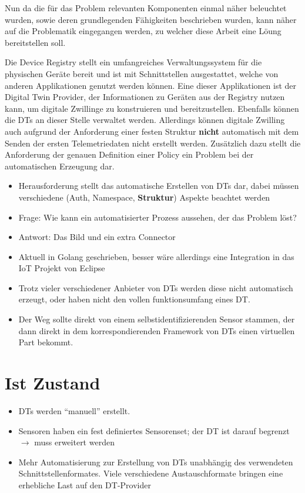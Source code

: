 Nun da die für das Problem relevanten Komponenten einmal näher beleuchtet wurden, sowie deren grundlegenden Fähigkeiten beschrieben wurden, kann näher auf die Problematik eingegangen werden, zu welcher diese Arbeit eine Löung bereitstellen soll. 

Die Device Registry stellt ein umfangreiches Verwaltungssystem für die physischen Geräte bereit und ist mit Schnittstellen ausgestattet, welche von anderen Applikationen genutzt werden können. Eine dieser Applikationen ist der Digital Twin Provider, der Informationen zu Geräten aus der Registry nutzen kann, um digitale Zwillinge zu konstruieren und bereitzustellen. Ebenfalls können die \ac{DT}s an dieser Stelle verwaltet werden. Allerdings können digitale Zwilling auch aufgrund der Anforderung einer festen Struktur \textbf{nicht} automatisch mit dem Senden der ersten Telemetriedaten nicht erstellt werden. Zusätzlich dazu stellt die Anforderung der genauen Definition einer Policy ein Problem bei der automatischen Erzeugung dar.

\begin{itemize}
    \item Herausforderung stellt das automatische Erstellen von DTs dar, dabei müssen verschiedene (Auth, Namespace, \textbf{Struktur}) Aspekte beachtet werden
    \item Frage: Wie kann ein automatisierter Prozess aussehen, der das Problem löst?
    \item Antwort: Das Bild und ein extra Connector
    \item Aktuell in Golang geschrieben, besser wäre allerdings eine Integration in das IoT Projekt von Eclipse
\end{itemize}

\begin{itemize}
    \item Trotz vieler verschiedener Anbieter von DTs werden diese nicht automatisch erzeugt, oder haben nicht den vollen funktionsumfang eines DT.
    \item Der Weg sollte direkt von einem selbstidentifizierenden Sensor stammen, der dann direkt in dem korrespondierenden Framework von DTs einen virtuellen Part bekommt.
\end{itemize}

\section{Ist Zustand}

\begin{itemize}
    \item DTs werden \enquote{manuell} erstellt.
    \item Sensoren haben ein fest definiertes Sensorenset; der DT ist darauf begrenzt $\rightarrow$ muss erweitert werden
    \item Mehr Automatisierung zur Erstellung von DTs unabhängig des verwendeten Schnittstellenformates. Viele verschiedene Austauschformate bringen eine erhebliche Last auf den DT-Provider
\end{itemize}